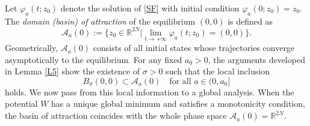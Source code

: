 \documentclass[12pt]{amsart}
\numberwithin{equation}{section}
\begin{document}
Let $\varphi_a(t;z_0)$ denote the solution of \eqref{SF} with initial condition $\varphi_a(0;z_0)=z_0$. The {\it domain (basin) of attraction} of the equilibrium $(0,0)$ is defined as
$$
\mathcal{A}_a(0):= \Big\{ z_0\in\mathbb{R}^{2N} \big| \lim_{t\to+\infty}\varphi_a(t;z_0)=(0,0)\Big\}.
$$
Geometrically, $\mathcal{A}_a(0)$ consists of all initial states whose trajectories converge asymptotically to the equilibrium. For any fixed $a_0>0$, the arguments developed in Lemma \ref{L5} show the existence of $\sigma>0$ such that the local inclusion
$$
B_\sigma(0,0)\subset \mathcal{A}_a(0)\quad\text{for all } a\in(0,a_0]
$$
holds. We now pass from this local information to a global analysis. When the potential $W$ has a unique global minimum and satisfies a monotonicity condition, the basin of attraction coincides with the whole phase space $\mathcal{A}_a(0) = \mathbb{R}^{2N}$.
\end{document}
